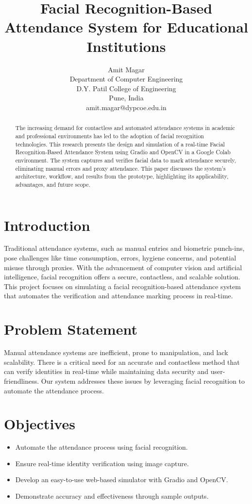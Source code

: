 \documentclass[12pt]{article}
\title{\bfseries Facial Recognition-Based Attendance System for Educational Institutions}
\author{Amit Magar\\Department of Computer Engineering\\D.Y. Patil College of Engineering\\Pune, India\\amit.magar@dypcoe.edu.in}
\date{}
\begin{document}
\maketitle

\begin{abstract}
The increasing demand for contactless and automated attendance systems in academic and professional environments has led to the adoption of facial recognition technologies. This research presents the design and simulation of a real-time Facial Recognition-Based Attendance System using Gradio and OpenCV in a Google Colab environment. The system captures and verifies facial data to mark attendance securely, eliminating manual errors and proxy attendance. This paper discusses the system's architecture, workflow, and results from the prototype, highlighting its applicability, advantages, and future scope.
\end{abstract}

\section{Introduction}
Traditional attendance systems, such as manual entries and biometric punch-ins, pose challenges like time consumption, errors, hygiene concerns, and potential misuse through proxies. With the advancement of computer vision and artificial intelligence, facial recognition offers a secure, contactless, and scalable solution. This project focuses on simulating a facial recognition-based attendance system that automates the verification and attendance marking process in real-time.

\section{Problem Statement}
Manual attendance systems are inefficient, prone to manipulation, and lack scalability. There is a critical need for an accurate and contactless method that can verify identities in real-time while maintaining data security and user-friendliness. Our system addresses these issues by leveraging facial recognition to automate the attendance process.

\section{Objectives}
\begin{itemize}
    \item Automate the attendance process using facial recognition.
    \item Ensure real-time identity verification using image capture.
    \item Develop an easy-to-use web-based simulator with Gradio and OpenCV.
    \item Demonstrate accuracy and effectiveness through sample outputs.
\end{itemize}
\end{document}
